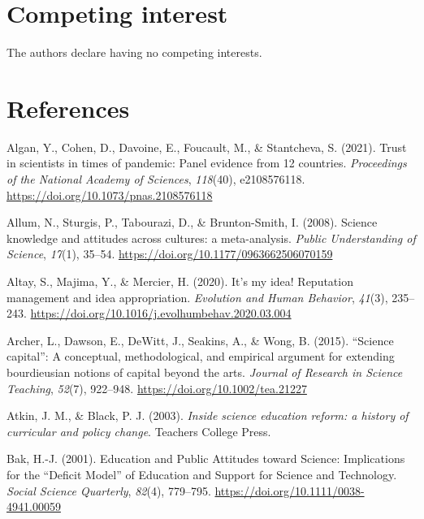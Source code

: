 \documentclass[
  jou,
  floatsintext,
  longtable,
  nolmodern,
  notxfonts,
  notimes,
  colorlinks=true,linkcolor=blue,citecolor=blue,urlcolor=blue]{apa7}
\newlength{\cslhangindent}
\newenvironment{CSLReferences}[2] %
 {\begin{list}{}{%
  \setlength{\itemindent}{0pt}
  \setlength{\leftmargin}{0pt}
  \setlength{\parsep}{0pt}
  \ifodd #1
   \setlength{\leftmargin}{\cslhangindent}
   \setlength{\itemindent}{-1\cslhangindent}
  \fi
  \setlength{\itemsep}{#2\baselineskip}}}
 {\end{list}}
\begin{document}
\section{Competing interest}\label{competing-interest}

The authors declare having no competing interests.

\section{References}\label{references}

\label{refs}
\begin{CSLReferences}{1}{0}
Algan, Y., Cohen, D., Davoine, E., Foucault, M., \& Stantcheva, S.
(2021). Trust in scientists in times of pandemic: Panel evidence from 12
countries. \emph{Proceedings of the National Academy of Sciences},
\emph{118}(40), e2108576118.
\url{https://doi.org/10.1073/pnas.2108576118}

Allum, N., Sturgis, P., Tabourazi, D., \& Brunton-Smith, I. (2008).
Science knowledge and attitudes across cultures: a meta-analysis.
\emph{Public Understanding of Science}, \emph{17}(1), 35--54.
\url{https://doi.org/10.1177/0963662506070159}

Altay, S., Majima, Y., \& Mercier, H. (2020). It's my idea! Reputation
management and idea appropriation. \emph{Evolution and Human Behavior},
\emph{41}(3), 235--243.
\url{https://doi.org/10.1016/j.evolhumbehav.2020.03.004}

Archer, L., Dawson, E., DeWitt, J., Seakins, A., \& Wong, B. (2015).
{``}Science capital{''}: A conceptual, methodological, and empirical
argument for extending bourdieusian notions of capital beyond the arts.
\emph{Journal of Research in Science Teaching}, \emph{52}(7), 922--948.
\url{https://doi.org/10.1002/tea.21227}

Atkin, J. M., \& Black, P. J. (2003). \emph{Inside science education
reform: a history of curricular and policy change}. Teachers College
Press.

Bak, H.-J. (2001). Education and Public Attitudes toward Science:
Implications for the {``}Deficit Model{''} of Education and Support for
Science and Technology. \emph{Social Science Quarterly}, \emph{82}(4),
779--795. \url{https://doi.org/10.1111/0038-4941.00059}


\end{CSLReferences}
\end{document}
